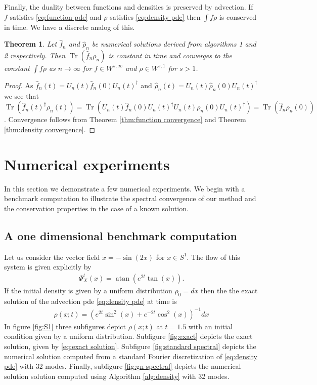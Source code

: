 \documentclass[final,leqno]{siamltex1213}
\newtheorem{thm}{Theorem}[section]
\DeclareMathOperator{\Tr}{Tr}
\begin{document}
Finally, the duality between functions and densities is preserved by advection.  If $f$ satisfies \eqref{eq:function pde} and $\rho $ satisfies \eqref{eq:density pde} then $\int f \rho$ is conserved in time.
We have a discrete analog of this.
\begin{thm}
	Let $\hat{f}_{n}$ and $\hat{\rho}_{n}$ be numerical solutions derived from algorithms 1 and 2 respectively.
	Then $\Tr( \hat{f}_{n} \rho_{n} )$ is constant in time and converges to the constant $\int f \rho$ as $n \to \infty$
	for $f \in W^{s,\infty}$ and $\rho \in W^{s,1}$ for $s>1$.
\end{thm}
\begin{proof}
	As $\hat{f}_{n}(t) = U_{n}(t) \hat{f}_{n}(0) U_{n}(t)^{\dagger}$ and $\hat{\rho}_{n}(t) = U_{n}(t) \hat{\rho}_{n}(0) U_{n}(t)^{\dagger}$
	we see that $\Tr( \hat{f}_{n}(t)^{\dagger} \rho_{n}(t) ) = \Tr( U_{n}(t) \hat{f}_{n}(0) U_{n}(t)^{\dagger} U_{n}(t) \rho_{n}(0) U_{n}(t)^{\dagger}) = \Tr( \hat{f}_{n} \rho_{n}(0) )$.
	Convergence follows from Theorem \ref{thm:function convergence} and Theorem \ref{thm:density convergence}.
\end{proof}

\section{Numerical experiments}

In this section we demonstrate a few numerical experiments.  We begin with a benchmark computation to illustrate the spectral convergence of our method and the conservation properties in the case of a known solution.

\subsection{A one dimensional benchmark computation}
Let us consider the vector field $\dot{x} = -\sin(2 x)$ for $x \in S^{1}$.
The flow of this system is given explicitly by
\begin{align}
	\Phi_{X}^{t}(x) = \operatorname{atan} \left( e^{2t} \tan( x) \right).
\end{align}
If the initial density is given by a uniform distribution $\rho_{0} = dx$ then the the exact solution of the advection pde \eqref{eq:density pde} at time is
\begin{align}
	\rho(x;t) =  \left( e^{2t} \sin^{2}(x) + e^{-2t} \cos^{2}(x) \right)^{-1}  dx \label{eq:exact solution}
\end{align}
 In figure \ref{fig:S1} three subfigures depict $\rho(x;t)$ at $t=1.5$ with an initial condition given by a uniform distribution.
Subfigure \ref{fig:exact} depicts the exact solution, given by \eqref{eq:exact solution}.  Subfigure \ref{fig:standard spectral} depicts the numerical solution computed
from a standard Fourier discretization of \eqref{eq:density pde} with 32 modes.
Finally, subfigure \ref{fig:gn spectral} depicts the numerical solution solution computed using Algorithm \ref{alg:density} with 32 modes.
\end{document}
